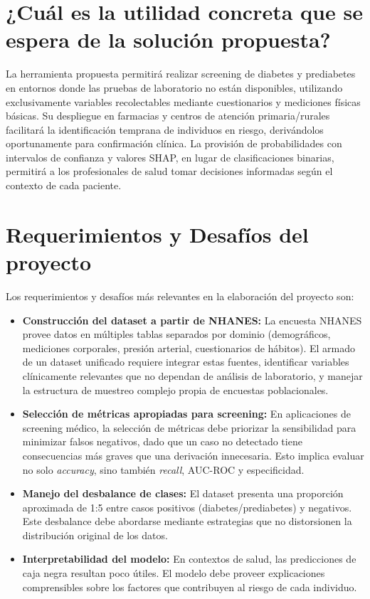 \documentclass[12pt, a4paper]{report}
\begin{document}
\section{¿Cuál es la utilidad concreta que se espera de la solución propuesta?}

La herramienta propuesta permitirá realizar screening de diabetes y prediabetes en entornos donde las pruebas de laboratorio no están disponibles, utilizando exclusivamente variables recolectables mediante cuestionarios y mediciones físicas básicas. Su despliegue en farmacias y centros de atención primaria/rurales facilitará la identificación temprana de individuos en riesgo, derivándolos oportunamente para confirmación clínica. La provisión de probabilidades con intervalos de confianza y valores SHAP, en lugar de clasificaciones binarias, permitirá a los profesionales de salud tomar decisiones informadas según el contexto de cada paciente.

\section{Requerimientos y Desafíos del proyecto}

Los requerimientos y desafíos más relevantes en la elaboración del proyecto son:

\begin{itemize}
    \item \textbf{Construcción del dataset a partir de NHANES:} La encuesta NHANES provee datos en múltiples tablas separados por dominio (demográficos, mediciones corporales, presión arterial, cuestionarios de hábitos). El armado de un dataset unificado requiere integrar estas fuentes, identificar variables clínicamente relevantes que no dependan de análisis de laboratorio, y manejar la estructura de muestreo complejo propia de encuestas poblacionales.

    \item \textbf{Selección de métricas apropiadas para screening:} En aplicaciones de screening médico, la selección de métricas debe priorizar la sensibilidad para minimizar falsos negativos, dado que un caso no detectado tiene consecuencias más graves que una derivación innecesaria. Esto implica evaluar no solo \textit{accuracy}, sino también \textit{recall}, AUC-ROC y especificidad.

    \item \textbf{Manejo del desbalance de clases:} El dataset presenta una proporción aproximada de 1:5 entre casos positivos (diabetes/prediabetes) y negativos. Este desbalance debe abordarse mediante estrategias que no distorsionen la distribución original de los datos.

    \item \textbf{Interpretabilidad del modelo:} En contextos de salud, las predicciones de caja negra resultan poco útiles. El modelo debe proveer explicaciones comprensibles sobre los factores que contribuyen al riesgo de cada individuo.
\end{itemize}
\end{document}
